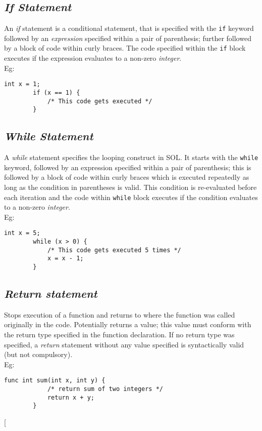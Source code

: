 \documentclass[letterpaper,12pt]{article}
\begin{document}
\subsection{\textit{If Statement}}
An \textit{if} statement is a conditional statement, that is specified with the \texttt{if} keyword followed by an \textit{expression} specified within a pair of parenthesis; further followed by a block of code within curly braces. The code specified within the \texttt{if} block executes if the expression evaluates to a non-zero \textit{integer}.\\
Eg: \begin{lstlisting}[aboveskip=-13pt]
        int x = 1;
        if (x == 1) {
            /* This code gets executed */
        }
    \end{lstlisting}

\subsection{\textit{While Statement}}
A \textit{while} statement specifies the looping construct in SOL. It starts with the \texttt{while} keyword, followed by an expression specified within a pair of parenthesis; this is followed by a block of code within curly braces which is executed repeatedly as long as the condition in parentheses is valid. This condition is re-evaluated before each iteration and the code within \texttt{while} block executes if the condition evaluates to a non-zero \textit{integer}. \\
Eg: \begin{lstlisting}[aboveskip=-13pt]
        int x = 5;
        while (x > 0) {
            /* This code gets executed 5 times */
            x = x - 1;
        }
    \end{lstlisting}

\subsection{\textit{Return statement}}
Stops execution of a function and returns to where the function was called originally in the code. Potentially returns a value; this value must conform with the return type specified in the function declaration. If no return type was specified, a \textit{return} statement without any value specified is syntactically valid (but not compulsory).\\
Eg: \begin{lstlisting}[aboveskip=-13pt]
        func int sum(int x, int y) {
            /* return sum of two integers */
            return x + y;
        }
    \end{lstlisting}[
    
\end{document}
